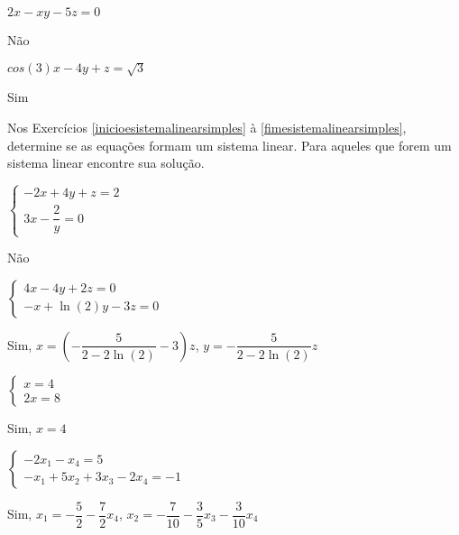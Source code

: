 \documentclass[12pt]{exam}
\begin{document}
\begin{exercicio}
    $2x - xy - 5z = 0$
    \begin{solucao}
        Não
    \end{solucao}
\end{exercicio}

\begin{exercicio}\label{fimequacoeslineares}
    $cos(3)x - 4y + z = \sqrt{3}$
    \begin{solucao}
        Sim
    \end{solucao}
\end{exercicio}

Nos Exercícios \ref{inicioesistemalinearsimples} à \ref{fimesistemalinearsimples}, determine se as equações formam um sistema linear. Para aqueles que forem um sistema linear encontre sua solução.

\begin{exercicio}\label{inicioesistemalinearsimples}
    $\begin{cases} -2x + 4y + z = 2\\ 3x - \dfrac{2}{y} = 0\end{cases}$
    \begin{solucao}
        Não
    \end{solucao}
\end{exercicio}

\begin{exercicio}
    $\begin{cases} 4x - 4y + 2z = 0\\ -x + \ln(2)y - 3z = 0\end{cases}$
    \begin{solucao}
        Sim, $x = \left(-\dfrac{5}{2 - 2\ln(2)} - 3\right)z$, $y = -\dfrac{5}{2 - 2\ln(2)}z$
    \end{solucao}
\end{exercicio}

\begin{exercicio}
    $\begin{cases} x = 4\\ 2x = 8\end{cases}$
    \begin{solucao}
        Sim, $x = 4$
    \end{solucao}
\end{exercicio}

\begin{exercicio}
    $\begin{cases} -2x_1 - x_4 = 5\\ -x_1 + 5x_2 + 3x_3 - 2x_4 = -1\end{cases}$
    \begin{solucao}
        Sim, $x_1 = -\dfrac{5}{2} - \dfrac{7}{2}x_4$, $x_2 = -\dfrac{7}{10} - \dfrac{3}{5}x_3 - \dfrac{3}{10}x_4$
    \end{solucao}
\end{exercicio}
\end{document}
